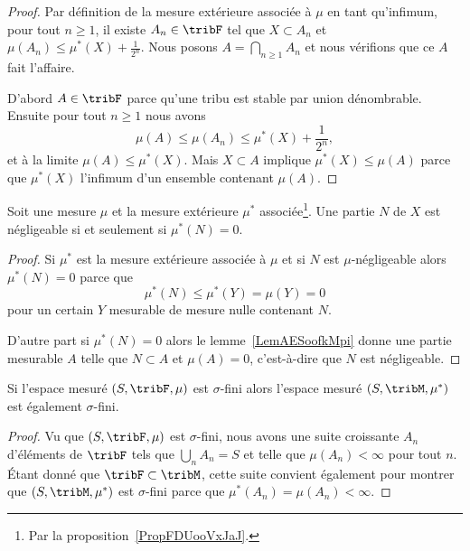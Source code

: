 \begin{proof}
    Par définition de la mesure extérieure associée à \( \mu\) en tant qu'infimum, pour tout \( n\geq 1\), il existe \( A_n\in\tribF\) tel que \( X\subset A_n\) et \( \mu(A_n)\leq \mu^*(X)+\frac{1}{ 2^n }\). Nous posons \( A=\bigcap_{n\geq 1}A_n\) et nous vérifions que ce \( A\) fait l'affaire.

    D'abord \( A\in\tribF\) parce qu'une tribu est stable par union dénombrable. Ensuite pour tout \( n\geq 1\) nous avons
    \begin{equation}
        \mu(A)\leq \mu(A_n)\leq \mu^*(X)+\frac{1}{ 2^n },
    \end{equation}
    et à la limite \( \mu(A)\leq \mu^*(X)\). Mais \( X\subset A\) implique \( \mu^*(X)\leq \mu(A)\) parce que \( \mu^*(X)\) l'infimum d'un ensemble contenant \( \mu(A)\).
\end{proof}

\begin{corollary}\label{LemXOUNooUbtpxm}
    Soit une mesure \( \mu\) et la mesure extérieure \( \mu^*\) associée\footnote{Par la proposition~\ref{PropFDUooVxJaJ}.}. Une partie \( N\) de \( X\) est négligeable si et seulement si \( \mu^*(N)=0\).
\end{corollary}

\begin{proof}
Si \( \mu^*\) est la mesure extérieure associée à \( \mu\) et si \( N\) est \( \mu\)-négligeable alors \( \mu^*(N)=0\) parce que
\begin{equation}
    \mu^*(N)\leq \mu^*(Y)=\mu(Y)=0
\end{equation}
pour un certain \( Y\) mesurable de mesure nulle contenant \( N\).

D'autre part si \( \mu^*(N)=0\) alors le lemme~\ref{LemAESoofkMpi} donne une partie mesurable \( A\) telle que \( N\subset A\) et \( \mu(A)=0\), c'est-à-dire que \( N\) est négligeable.
\end{proof}

\begin{lemma}       \label{LemOAEoocBDaO}
    Si l'espace mesuré \( (S,\tribF,\mu)\) est \( \sigma\)-fini alors l'espace mesuré \( (S,\tribM,\mu^*)\) est également \( \sigma\)-fini.
\end{lemma}

\begin{proof}
    Vu que \( (S,\tribF,\mu)\) est \( \sigma\)-fini, nous avons une suite croissante \( A_n\) d'éléments de \( \tribF\) tels que \( \bigcup_nA_n=S\) et telle que \( \mu(A_n)<\infty\) pour tout \( n\). Étant donné que \( \tribF\subset\tribM\), cette suite convient également pour montrer que \( (S,\tribM,\mu^*)\) est \( \sigma\)-fini parce que \( \mu^*(A_n)=\mu(A_n)<\infty\).
\end{proof}

